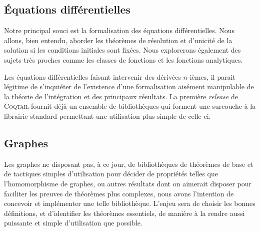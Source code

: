 \documentclass[11pt]{article}
\newcommand{\coqtail}{\textsc{Coqtail}}
\begin{document}
\subsection{Équations différentielles}

Notre principal souci est la formalisation des équations différentielles. Nous allons, bien entendu, aborder les théorèmes de résolution et d'unicité de la solution si les conditions initiales sont fixées. Nous explorerons également des sujets très proches comme les classes de fonctions et les fonctions analytiques.

Les équations différentielles faisant intervenir des dérivées $n$-ièmes, il parait légitime de s'inquiéter de l'existence d'une formalisation aisément manipulable de la théorie de l'intégration et des principaux résultats. La première \textit{release} de \coqtail{} fournit déjà un ensemble de bibliothèques qui forment une surcouche à la librairie standard permettant une utilisation plus simple de celle-ci.

\subsection{Graphes}

Les graphes ne disposant pas, à ce jour, de bibliothèques de théorèmes de base et de tactiques simples d'utilisation pour décider de propriétés telles que l'homomorphisme de graphes, ou autres résultats dont on aimerait disposer pour faciliter les preuves de théorèmes plus complexes, nous avons l'intention de concevoir et implémenter une telle bibliothèque. L'enjeu sera de choisir les bonnes définitions, et d'identifier les théorèmes essentiels, de manière à la rendre aussi puissante et simple d'utilisation que possible.
\end{document}
